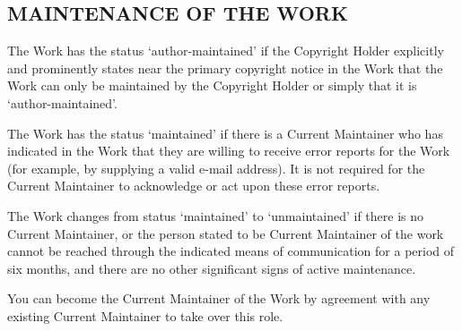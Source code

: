 \subsection{MAINTENANCE OF THE WORK}

The Work has the status `author-maintained' if the Copyright Holder
explicitly and prominently states near the primary copyright notice in
the Work that the Work can only be maintained by the Copyright Holder
or simply that it is `author-maintained'.

The Work has the status `maintained' if there is a Current Maintainer
who has indicated in the Work that they are willing to receive error
reports for the Work (for example, by supplying a valid e-mail
address). It is not required for the Current Maintainer to acknowledge
or act upon these error reports.

The Work changes from status `maintained' to `unmaintained' if there
is no Current Maintainer, or the person stated to be Current
Maintainer of the work cannot be reached through the indicated means
of communication for a period of six months, and there are no other
significant signs of active maintenance.

You can become the Current Maintainer of the Work by agreement with
any existing Current Maintainer to take over this role.

